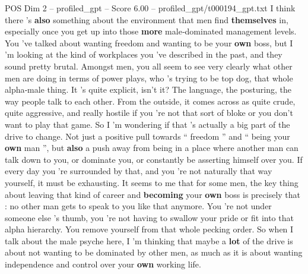 \begin{textsample}{POS Dim 2 – profiled\_gpt – Score 6.00 – profiled\_gpt/t000194\_gpt.txt}  \label{ex:f2_pos_016}
I think there ’s \textbf{also} something about the environment that men find \textbf{themselves} in, especially once you get up into those \textbf{more} male‑dominated management levels.
You ’ve talked about wanting freedom and wanting to be your \textbf{own} boss, but I ’m looking at the kind of workplaces you ’ve described in the past, and they sound pretty brutal.
Amongst men, you all seem to see very clearly what other men are doing in terms of power plays, who ’s trying to be top dog, that whole alpha‑male thing.
It ’s quite explicit, isn't it?
The language, the posturing, the way people talk to each other.
From the outside, it comes across as quite crude, quite aggressive, and really hostile if you ’re not that sort of bloke or you don't want to play that game.
So I ’m wondering if that ’s actually a big part of the drive to change.
Not just a positive pull towards “ freedom ” and “ being your \textbf{own} man ”, but \textbf{also} a push away from being in a place where another man can talk down to you, or dominate you, or constantly be asserting himself over you.
If every day you ’re surrounded by that, and you ’re not naturally that way yourself, it must be exhausting.
It seems to me that for some men, the key thing about leaving that kind of career and \textbf{becoming} your \textbf{own} boss is precisely that : no other man gets to speak to you like that anymore.
You ’re not under someone else ’s thumb, you ’re not having to swallow your pride or fit into that alpha hierarchy.
You remove yourself from that whole pecking order.
So when I talk about the male psyche here, I ’m thinking that maybe a \textbf{lot} of the drive is about not wanting to be dominated by other men, as much as it is about wanting independence and control over your \textbf{own} working life.

\end{textsample}
